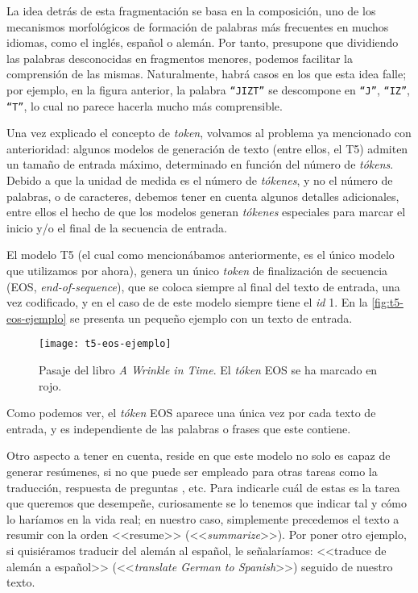 La idea detrás de esta fragmentación se basa en la composición, uno de los mecanismos morfológicos de formación de palabras más frecuentes \cite{cetnarowska05} en muchos idiomas, como el inglés, español o alemán. Por tanto, presupone que dividiendo las palabras desconocidas en fragmentos menores, podemos facilitar la comprensión de las mismas. Naturalmente, habrá casos en los que esta idea falle; por ejemplo, en la figura anterior, la palabra \texttt{``JIZT''} se descompone en \texttt{``J''}, \texttt{``IZ''}, \texttt{``T''}, lo cual no parece hacerla mucho más comprensible.

Una vez explicado el concepto de \emph{token}, volvamos al problema ya mencionado con anterioridad: algunos modelos de generación de texto (entre ellos, el T5) admiten un tamaño de entrada máximo, determinado en función del número de \emph{tókens}. Debido a que la unidad de medida es el número de \emph{tókenes}, y no el número de palabras, o de caracteres, debemos tener en cuenta algunos detalles adicionales, entre ellos el hecho de que los modelos generan \emph{tókenes} especiales para marcar el inicio y/o el final de la secuencia de entrada.

El modelo T5 (el cual como mencionábamos anteriormente, es el único modelo que utilizamos por ahora), genera un único \emph{token} de finalización de secuencia (EOS, \emph{end-of-sequence}), que se coloca siempre al final del texto de entrada, una vez codificado, y en el caso de de este modelo siempre tiene el \emph{id} 1. En la \autoref{fig:t5-eos-ejemplo} se presenta un pequeño ejemplo con un texto de entrada.

\begin{figure}[h]
	\centering
	\texttt{[image: t5-eos-ejemplo]}
	\caption[Ejempo de codificación del texto.]{Pasaje del libro \emph{A Wrinkle in Time}. El \emph{tóken} EOS se ha marcado en rojo.}
	\label{fig:t5-eos-ejemplo}
\end{figure}

Como podemos ver, el \emph{tóken} EOS aparece una única vez por cada texto de entrada, y es independiente de las palabras o frases que este contiene.

Otro aspecto a tener en cuenta, reside en que este modelo no solo es capaz de generar resúmenes, si no que puede ser empleado para otras tareas como la traducción, respuesta de preguntas \cite{raffel19}, etc. Para indicarle cuál de estas es la tarea que queremos que desempeñe, curiosamente se lo tenemos que indicar tal y cómo lo haríamos en la vida real; en nuestro caso, simplemente precedemos el texto a resumir con la orden <<resume>> (<<\emph{summarize}>>). Por poner otro ejemplo, si quisiéramos traducir del alemán al español, le señalaríamos: <<traduce de alemán a español>> (<<\emph{translate German to Spanish}>>) seguido de nuestro texto.

